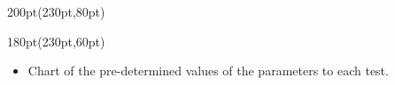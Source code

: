 \begin{frame}
 \begin{textblock*}{200pt}(230pt,80pt)
 \begin{table}[tp]
  \tiny\centering
  
 \end{table}
 \end{textblock*}


\begin{textblock*}{180pt}(230pt,60pt)
\begin{itemize}
\item Chart of the pre-determined values of the parameters to each test.
\end{itemize}

\end{textblock*}

\end{frame}

